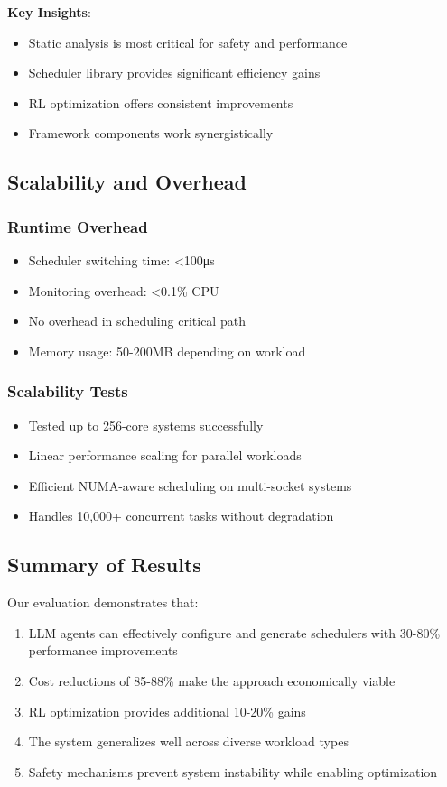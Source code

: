 \textbf{Key Insights}:
\begin{itemize}
\item Static analysis is most critical for safety and performance
\item Scheduler library provides significant efficiency gains
\item RL optimization offers consistent improvements
\item Framework components work synergistically
\end{itemize}

\subsection{Scalability and Overhead}

\subsubsection{Runtime Overhead}
\begin{itemize}
\item Scheduler switching time: <100μs
\item Monitoring overhead: <0.1\% CPU
\item No overhead in scheduling critical path
\item Memory usage: 50-200MB depending on workload
\end{itemize}

\subsubsection{Scalability Tests}
\begin{itemize}
\item Tested up to 256-core systems successfully
\item Linear performance scaling for parallel workloads
\item Efficient NUMA-aware scheduling on multi-socket systems
\item Handles 10,000+ concurrent tasks without degradation
\end{itemize}

\subsection{Summary of Results}

Our evaluation demonstrates that:
\begin{enumerate}
\item LLM agents can effectively configure and generate schedulers with 30-80\% performance improvements
\item Cost reductions of 85-88\% make the approach economically viable
\item RL optimization provides additional 10-20\% gains
\item The system generalizes well across diverse workload types
\item Safety mechanisms prevent system instability while enabling optimization
\end{enumerate}